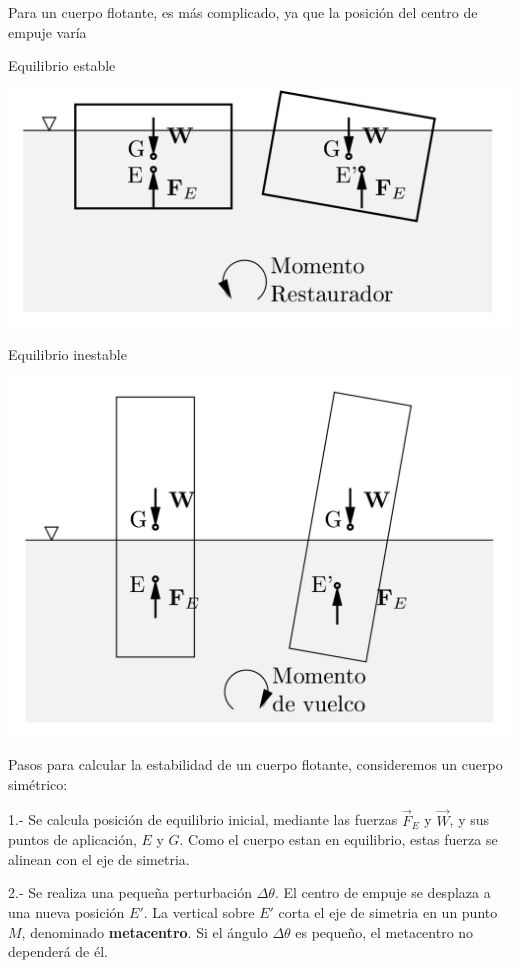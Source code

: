 

Para un cuerpo flotante, es m\'as complicado, ya que la posici\'on del centro de empuje var\'ia


Equilibrio estable 
\begin{center}
	\includegraphics[width=0.7\linewidth]{TeX_files/chapter02-Hidrostatica/estabilidad2}
\end{center}



Equilibrio inestable
\begin{center}
	\includegraphics[width=0.7\linewidth]{TeX_files/chapter02-Hidrostatica/estabilidad3}
\end{center}


Pasos para calcular la estabilidad de un cuerpo flotante, consideremos un cuerpo sim\'etrico:

1.- Se calcula posici\'on de equilibrio inicial, mediante las fuerzas $\vec F_E$ y $\vec W$, y sus puntos de aplicaci\'on, $E$ y $G$. Como el cuerpo estan en equilibrio, estas fuerza se alinean con el eje de simetria.

2.- Se realiza una peque\~na perturbaci\'on $\Delta \theta$. El centro de empuje se desplaza a una nueva posici\'on $E'$. La vertical sobre $E'$ corta el eje de simetria en un punto $M$, denominado \textbf{metacentro}. Si el \'angulo $\Delta \theta$ es peque\~no, el metacentro no depender\'a de \'el.

